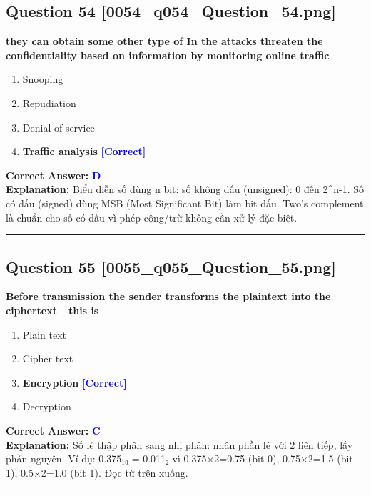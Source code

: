 \documentclass[11pt,a4paper]{article}
\begin{document}
\begin{minipage}{\textwidth}
\subsection*{Question 54 \quad \footnotesize{[0054\_q054\_Question\_54.png]}}
\noindent \textbf{they can obtain some other type of In the attacks threaten the confidentiality based on information by monitoring online traffic}

\begin{enumerate}[label=\Alph*.]
    \item Snooping
    \item Repudiation
    \item Denial of service
    \item \textbf{Traffic analysis} \hfill \textcolor{blue}{\textbf{[Correct]}}
\end{enumerate}

\noindent \textbf{Correct Answer:} \textcolor{blue}{\textbf{D}} \\[2pt]
\noindent \textbf{Explanation:} Biểu diễn số dùng n bit: số không dấu (unsigned): 0 đến 2\textasciicircum{}n-1. Số có dấu (signed) dùng MSB (Most Significant Bit) làm bit dấu. Two's complement là chuẩn cho số có dấu vì phép cộng/trừ không cần xử lý đặc biệt.

\par\vspace{0.3cm}
\hrule
\vspace{0.3cm}
\end{minipage}

\begin{minipage}{\textwidth}
\subsection*{Question 55 \quad \footnotesize{[0055\_q055\_Question\_55.png]}}
\noindent \textbf{Before transmission the sender transforms the plaintext into the ciphertext—this is}

\begin{enumerate}[label=\Alph*.]
    \item Plain text
    \item Cipher text
    \item \textbf{Encryption} \hfill \textcolor{blue}{\textbf{[Correct]}}
    \item Decryption
\end{enumerate}

\noindent \textbf{Correct Answer:} \textcolor{blue}{\textbf{C}} \\[2pt]
\noindent \textbf{Explanation:} Số lẻ thập phân sang nhị phân: nhân phần lẻ với 2 liên tiếp, lấy phần nguyên. Ví dụ: 0.375₁₀ = 0.011₂ vì 0.375×2=0.75 (bit 0), 0.75×2=1.5 (bit 1), 0.5×2=1.0 (bit 1). Đọc từ trên xuống.

\par\vspace{0.3cm}
\hrule
\vspace{0.3cm}
\end{minipage}
\end{document}
